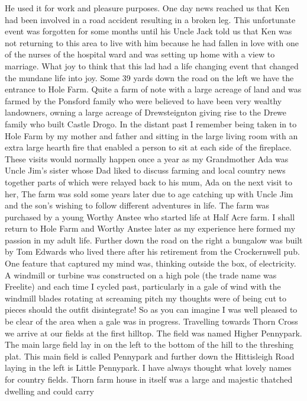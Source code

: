 He used it for work and pleasure purposes. One day news reached us that Ken had
been involved in a road accident resulting in a broken leg. This unfortunate
event was forgotten for some months until his Uncle Jack told us that Ken was
not returning to this area to live with him because he had fallen in love with
one of the nurses of the hospital ward and was setting up home with a view to
marriage. What joy to think that this lad had a life changing event that
changed the mundane life into joy. Some 39 yards down the road on the left we
have the entrance to Hole Farm. Quite a farm of note with a large acreage of
land and was farmed by the Ponsford family who were believed to have been very
wealthy landowners, owning a large acreage of Drewsteignton giving rise to the
Drewe family who built Castle Drogo. In the distant past I remember being taken
in to Hole Farm by my mother and father and sitting in the large living room
with an extra large hearth fire that enabled a person to sit at each side of
the fireplace. These visits would normally happen once a year as my Grandmother
Ada was Uncle Jim's sister whose Dad liked to discuss farming and local country
news together parts of which were relayed back to his mum, Ada on the next
visit to her,  The farm was sold some years later due to age catching up with
Uncle Jim and the son's wishing to follow different adventures in life. The
farm was purchased by a young Worthy Anstee who started life at Half Acre farm.
I shall return to Hole Farm and Worthy Anstee later as my experience here
formed my passion in my adult life. Further down the road on the right a
bungalow was built by Tom Edwards who lived there after his retirement from the
Crockernwell pub. One feature that captured my mind was, thinking outside the
box, of electricity. A windmill or turbine was constructed  on a  high pole
(the trade name was Freelite) and each time I cycled past, particularly in a
gale of wind with  the windmill blades rotating at screaming pitch my thoughts
were of being cut to pieces should the outfit disintegrate!  So as you can
imagine I was well pleased to be clear of the area when a gale was in progress.
Travelling towards Thorn Cross we arrive at our fields at the first hilltop.
The field was named Higher Pennypark. The main large field lay in on the left
to the bottom of the hill to the threshing plat. This main field is called
Pennypark and further down the Hittisleigh Road laying in the left is Little
Pennypark. I have always thought what lovely names for country fields. Thorn
farm house in itself was a large and majestic thatched dwelling and could carry

